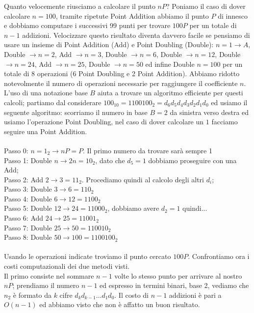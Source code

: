 \documentclass[a4paper,12pt]{tesiinfo}
\begin{document}
Quanto velocemente riusciamo a calcolare il punto $nP$? Poniamo il caso di dover calcolare $n=100$, tramite ripetute Point Addition abbiamo il punto $P$ di innesco e dobbiamo computare i successivi 99 punti per trovare $100P$ per un totale di $n-1$ addizioni. Velocizzare questo risultato diventa davvero facile se pensiamo di usare un insieme di Point Addition (Add) e Point Doubling (Double): $n=1 \to A$, Double $\to n=2$, Add $\to n=3$, Double $\to n=6$, Double $\to n=12$, Double $\to n=24$, Add $\to n=25$, Double $\to n=50$ ed infine Double $n=100$ per un totale di 8 operazioni (6 Point Doubling e 2 Point Addition). Abbiamo ridotto notevolmente il numero di operazioni necessarie per raggiungere il coefficiente $n$. 
\\
L'uso di una notazione base $B$ aiuta a trovare un algoritmo efficiente per questi calcoli; partiamo dal considerare $100_{10} = 1100100_2 = d_6d_5d_4d_3d_2d_1d_0$ ed usiamo il seguente algoritmo: scorriamo il numero in base $B=2$ da sinistra verso destra ed usiamo l'operazione Point Doubling, nel caso di dover calcolare un $1$ facciamo seguire una Point Addition. 
\\
\\
Passo 0: $n=1_2 \to nP = P$. Il primo numero da trovare sar\`a sempre 1\\
Passo 1: Double $n \to 2n = 10_2$, dato che $d_5 = 1$ dobbiamo proseguire con una Add;\\
Passo 2: Add  $2 \to 3 = 11_2$. Procediamo quindi al calcolo degli altri $d_i$;\\
Passo 3: Double $3 \to 6 = 110_2$\\
Passo 4: Double $6 \to 12 = 1100_2$\\
Passo 5: Double $12 \to 24 = 11000_2$, dobbiamo avere $d_2 = 1$ quindi...\\
Passo 6: Add  $24 \to 25 = 11001_2$\\
Passo 7: Double $25 \to 50 = 110010_2$\\
Passo 8: Double $50 \to 100 = 1100100_2$\\
\\
Usando le operazioni indicate troviamo il punto cercato $100P$. Confrontiamo ora i costi computazionali dei due metodi visti. 
\\
Il primo consiste nel sommare $n-1$ volte lo stesso punto per arrivare al nostro $nP$; prendiamo il numero $n-1$ ed espresso in termini binari, base 2, vediamo che $n_2$ \`e formato da $k$ cifre $d_kd_{k-1} \ldots d_1d_0$. Il costo di $n-1$ addizioni \`e pari a $O(n-1)$ ed abbiamo visto che non \`e affatto un buon risultato. 
\end{document}
